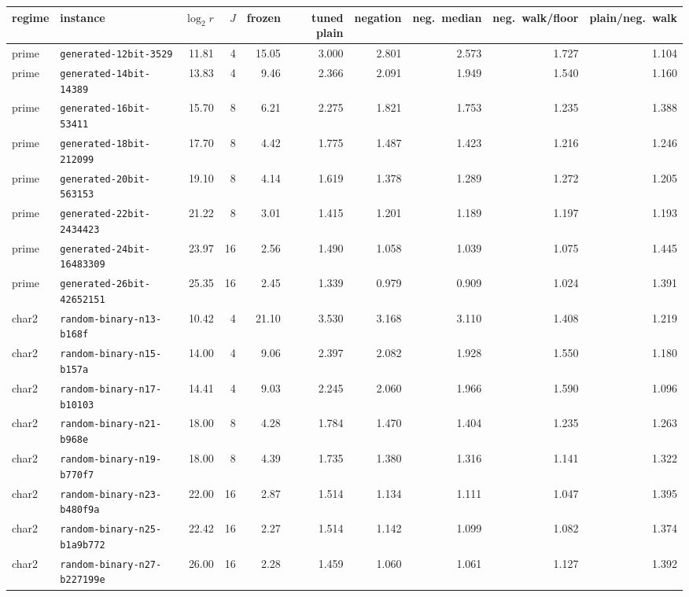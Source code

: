 \begin{tabular}{@{}llrrrrrrrr@{}}
\toprule
regime & instance & $\log_2 r$ & $J$ & frozen & tuned plain & negation & neg.\ median & neg.\ walk/floor & plain/neg.\ walk \\
\midrule
prime & \texttt{generated-12bit-3529} & 11.81 & 4 & 15.05 & 3.000 & 2.801 & 2.573 & 1.727 & 1.104 \\
prime & \texttt{generated-14bit-14389} & 13.83 & 4 & 9.46 & 2.366 & 2.091 & 1.949 & 1.540 & 1.160 \\
prime & \texttt{generated-16bit-53411} & 15.70 & 8 & 6.21 & 2.275 & 1.821 & 1.753 & 1.235 & 1.388 \\
prime & \texttt{generated-18bit-212099} & 17.70 & 8 & 4.42 & 1.775 & 1.487 & 1.423 & 1.216 & 1.246 \\
prime & \texttt{generated-20bit-563153} & 19.10 & 8 & 4.14 & 1.619 & 1.378 & 1.289 & 1.272 & 1.205 \\
prime & \texttt{generated-22bit-2434423} & 21.22 & 8 & 3.01 & 1.415 & 1.201 & 1.189 & 1.197 & 1.193 \\
prime & \texttt{generated-24bit-16483309} & 23.97 & 16 & 2.56 & 1.490 & 1.058 & 1.039 & 1.075 & 1.445 \\
prime & \texttt{generated-26bit-42652151} & 25.35 & 16 & 2.45 & 1.339 & 0.979 & 0.909 & 1.024 & 1.391 \\
\addlinespace
char2 & \texttt{random-binary-n13-b168f} & 10.42 & 4 & 21.10 & 3.530 & 3.168 & 3.110 & 1.408 & 1.219 \\
char2 & \texttt{random-binary-n15-b157a} & 14.00 & 4 & 9.06 & 2.397 & 2.082 & 1.928 & 1.550 & 1.180 \\
char2 & \texttt{random-binary-n17-b10103} & 14.41 & 4 & 9.03 & 2.245 & 2.060 & 1.966 & 1.590 & 1.096 \\
char2 & \texttt{random-binary-n21-b968e} & 18.00 & 8 & 4.28 & 1.784 & 1.470 & 1.404 & 1.235 & 1.263 \\
char2 & \texttt{random-binary-n19-b770f7} & 18.00 & 8 & 4.39 & 1.735 & 1.380 & 1.316 & 1.141 & 1.322 \\
char2 & \texttt{random-binary-n23-b480f9a} & 22.00 & 16 & 2.87 & 1.514 & 1.134 & 1.111 & 1.047 & 1.395 \\
char2 & \texttt{random-binary-n25-b1a9b772} & 22.42 & 16 & 2.27 & 1.514 & 1.142 & 1.099 & 1.082 & 1.374 \\
char2 & \texttt{random-binary-n27-b227199e} & 26.00 & 16 & 2.28 & 1.459 & 1.060 & 1.061 & 1.127 & 1.392 \\
\bottomrule
\end{tabular}

